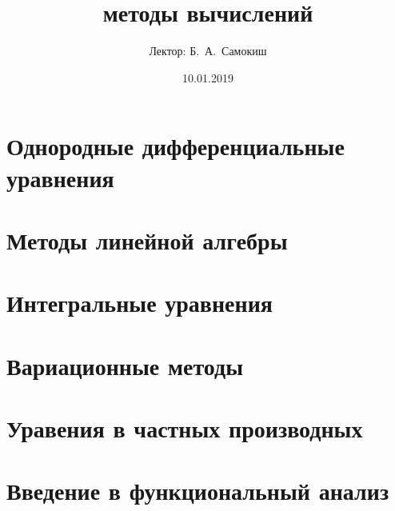 \documentclass{trlnotes}
\title{методы вычислений}
\date{10.01.2019}
\author{Лектор: Б.~А.~Самокиш}
\begin{document}
 
\maketitle
\tableofcontents
\clearpage

\makeatletter
\let \oldxypicxto \xto
\let \xto\relax
\newcommand\xto[1]{\ensuremath \xrightarrow[#1]{}}
\makeatother
\chapter{Однородные дифференциальные уравнения}
\label{chap:ode}


\chapter{Методы линейной алгебры}
\label{chap:linal}


\chapter{Интегральные уравнения}
\label{chap:inteq}


\chapter{Вариационные методы}
\label{chap:varm}


\let \xto=\oldxypicxto
\chapter{Уравения в частных производных}
\label{chap:pde}


\clearpage

\appendix
\chapter{Введение в функциональный анализ}
\label{chap:funcan}


% 

\nocite{*}
\printbibliography[
  heading=bibintoc,
  title={Использованная литература}
]
\end{document}
